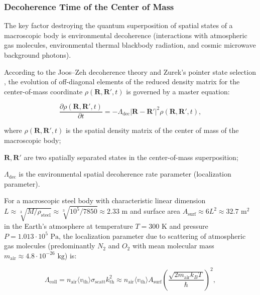 \subsubsection{Decoherence Time of the Center of Mass}\label{sec:5.1.3}

The key factor destroying the quantum superposition of spatial states of a macroscopic body is environmental decoherence (interactions with atmospheric gas molecules, environmental thermal blackbody radiation, and cosmic microwave background photons).

According to the Joos--Zeh decoherence theory \cite{ref38} and Zurek's pointer state selection \cite{ref39}, the evolution of off-diagonal elements of the reduced density matrix for the center-of-mass coordinate $\rho(\mathbf{R}, \mathbf{R}', t)$ is governed by a master equation:

\begin{equation}\label{eq:5.8}\tag{5.8}
\frac{\partial \rho(\mathbf{R}, \mathbf{R}', t)}{\partial t} = - \Lambda_{\text{dec}} |\mathbf{R} - \mathbf{R}'|^2 \rho(\mathbf{R}, \mathbf{R}', t),
\end{equation}

where $\rho(\mathbf{R}, \mathbf{R}', t)$ is the spatial density matrix of the center of mass of the macroscopic body;  

$\mathbf{R}, \mathbf{R}'$ are two spatially separated states in the center-of-mass superposition;  

$\Lambda_{\text{dec}}$ is the environmental spatial decoherence rate parameter (localization parameter).

For a macroscopic steel body with characteristic linear dimension $L \approx \sqrt[3]{M/\rho_{\text{steel}}} \approx \sqrt[3]{10^5 / 7850} \approx 2.33\text{ m}$ and surface area $A_{\text{surf}} \approx 6 L^2 \approx 32.7\text{ m}^2$ in the Earth's atmosphere at temperature $T = 300\text{ K}$ and pressure $P = 1.013 \cdot 10^5\text{ Pa}$, the localization parameter due to scattering of atmospheric gas molecules (predominantly $N_2$ and $O_2$ with mean molecular mass $m_{\text{air}} \approx 4.8 \cdot 10^{-26}\text{ kg}$) is:

\begin{equation}\label{eq:5.9}\tag{5.9}
\Lambda_{\text{coll}} = n_{\text{air}} \langle v_{\text{th}} \rangle \sigma_{\text{scatt}} k_{\text{th}}^2 \approx n_{\text{air}} \langle v_{\text{th}} \rangle A_{\text{surf}} \left( \frac{\sqrt{2 m_{\text{air}} k_B T}}{\hbar} \right)^2,
\end{equation}

